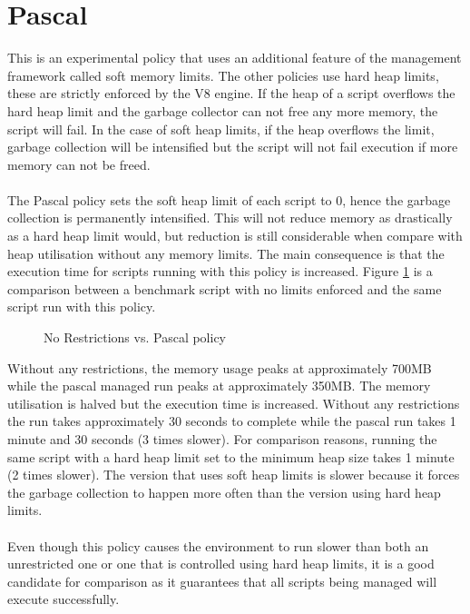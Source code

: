 \documentclass{l4proj}
\begin{document}
\section{Pascal}
\hspace*{3em} This is an experimental policy that uses an additional feature of the management framework called soft memory limits. The other policies use hard heap limits, these are strictly enforced by the V8 engine. If the heap of a script overflows the hard heap limit and the garbage collector can not free any more memory, the script will fail. In the case of soft heap limits, if the heap overflows the limit, garbage collection will be intensified but the script will not fail execution if more memory can not be freed.
\\\\
The Pascal policy sets the soft heap limit of each script to 0, hence the garbage collection is permanently intensified. This will not reduce memory as drastically as a hard heap limit would, but reduction is still considerable when compare with heap utilisation without any memory limits. The main consequence is that the execution time for scripts running with this policy is increased. Figure \ref{pascal} is a comparison between a benchmark script with no limits enforced and the same script run with this policy.

\begin{figure}[!ht]
\caption{No Restrictions vs. Pascal policy}
\label{pascal}
\end{figure}

Without any restrictions, the memory usage peaks at approximately 700MB while the pascal managed run peaks at approximately 350MB. The memory utilisation is halved but the execution time is increased. Without any restrictions the run takes approximately 30 seconds to complete while the pascal run takes 1 minute and 30 seconds (3 times slower). For comparison reasons, running the same script with a hard heap limit set to the minimum heap size takes 1 minute (2 times slower). The version that uses soft heap limits is slower because it forces the garbage collection to happen more often than the version using hard heap limits.
\\\\
Even though this policy causes the environment to run slower than both an unrestricted one or one that is controlled using hard heap limits, it is a good candidate for comparison as it guarantees that all scripts being managed will execute successfully.
\end{document}

